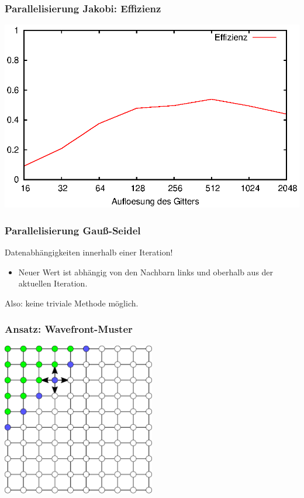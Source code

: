 \documentclass{beamer}
\begin{document}
\begin{frame}
    \frametitle{Parallelisierung Jakobi: Effizienz}
    \includegraphics[width=\textwidth]{plots/effizienzjakobi}
\end{frame}

\begin{frame}
    \frametitle{Parallelisierung Gauß-Seidel}
    Datenabhängigkeiten innerhalb einer Iteration!
    \begin{itemize}
        \item Neuer Wert ist abhängig von den Nachbarn links und oberhalb aus der aktuellen Iteration.
    \end{itemize}
    Also: keine triviale Methode möglich.
\end{frame}

\begin{frame}
    \frametitle{Ansatz: Wavefront-Muster}
    \begin{center}
        \includegraphics[width=0.5\textwidth]{wavefront-datadependencies}
    \end{center}
\end{frame}
\end{document}
